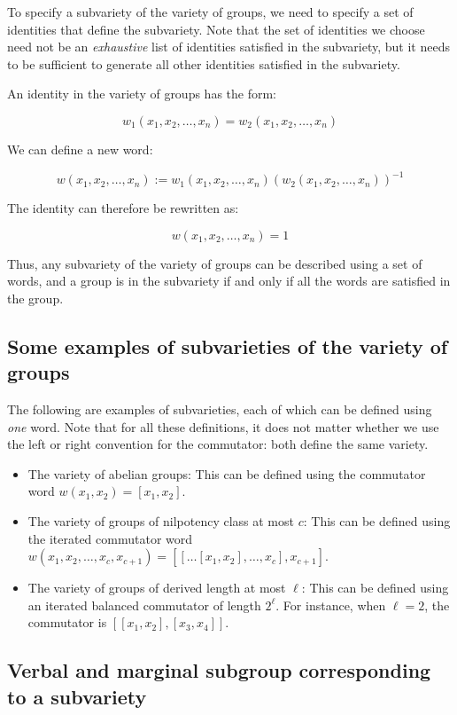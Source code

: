 To specify a subvariety of the variety of groups, we need to specify a
set of identities that define the subvariety. Note that the set of
identities we choose need not be an {\em exhaustive} list of
identities satisfied in the subvariety, but it needs to be sufficient
to generate all other identities satisfied in the subvariety.

An identity in the variety of groups has the form:

$$w_1(x_1,x_2,\dots,x_n) = w_2(x_1,x_2,\dots,x_n)$$

We can define a new word:

$$w(x_1,x_2,\dots,x_n) := w_1(x_1,x_2,\dots,x_n)(w_2(x_1,x_2,\dots,x_n))^{-1}$$

The identity can therefore be rewritten as:

$$w(x_1,x_2,\dots,x_n) = 1$$

Thus, any subvariety of the variety of groups can be described using a
set of words, and a group is in the subvariety if and only if all the
words are satisfied in the group.

\subsection{Some examples of subvarieties of the variety of groups}

The following are examples of subvarieties, each of which can be
defined using {\em one} word. Note that for all these definitions, it
does not matter whether we use the left or right convention for the
commutator: both define the same variety.

\begin{itemize}
\item The variety of abelian groups: This can be defined using the
  commutator word $w(x_1,x_2) = [x_1,x_2]$. 
\item The variety of groups of nilpotency class at most $c$: This can
  be defined using the iterated commutator word
  $w(x_1,x_2,\dots,x_c,x_{c+1}) = [[ \dots
      [x_1,x_2],\dots,x_c],x_{c+1}]$. 
\item The variety of groups of derived length at most $\ell$: This can
  be defined using an iterated balanced commutator of length
  $2^\ell$. For instance, when $\ell = 2$, the commutator is
  $[[x_1,x_2],[x_3,x_4]]$.
\end{itemize}

\subsection{Verbal and marginal subgroup corresponding to a subvariety}

